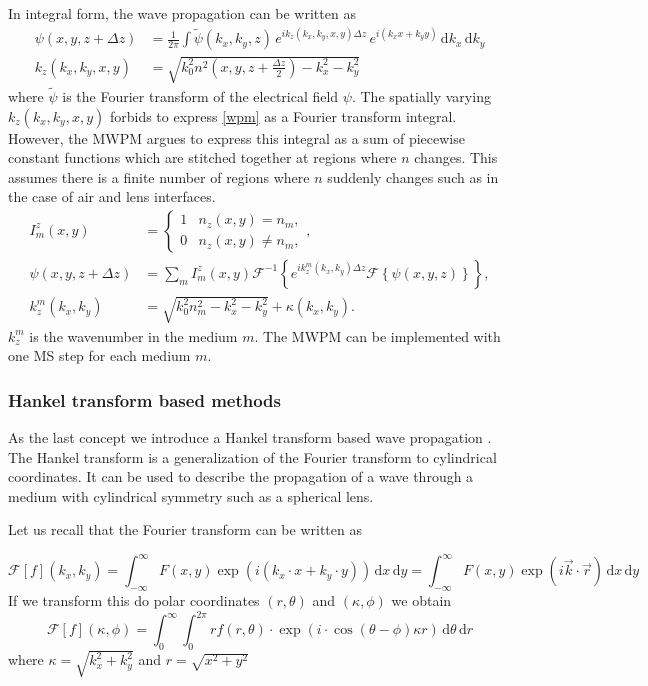 \documentclass[a4paper,12pt]{article}
\begin{document}
In integral form, the wave propagation can be written as
\begin{align}
\label{wpm}
    \psi(x,y,z+\Delta z) &= \frac{1}{2\pi} \int \widetilde{\psi}(k_x, k_y, z) \, e^{ik_z(k_x, k_y, x, y) \Delta z} \, e^{i (k_x x + k_y y)} \, \mathrm{d}k_x \, \mathrm{d}k_y\\
    k_z(k_x, k_y, x, y) &= \sqrt{k_0^2 n^2 \left( x,y,z + \frac{\Delta z}{2} \right) - k_x^2 - k_y^2}
\end{align}
where $\widetilde{\psi}$ is the Fourier transform of the electrical field $\psi$.
The spatially varying $k_z(k_x, k_y, x, y)$ forbids to express \autoref{wpm} as a Fourier transform integral.
However, the MWPM argues to express this integral as a sum of piecewise constant functions which are stitched together at regions where $n$ changes.
This assumes there is a finite number of regions where $n$ suddenly changes such as in the case of air and lens interfaces.
\begin{align}
    I_m^z(x,y) &=
    \begin{cases}
    1 & n_z(x,y) = n_m, \\
    0 & n_z(x,y) \ne n_m,
    \end{cases}, \\
    \psi(x,y,z+\Delta z) &= \sum_m I_m^z(x,y) \mathcal{F}^{-1} \left\{ e^{i k_z^m(k_x,k_y)\Delta z} \mathcal{F} \left\{\psi(x,y,z) \right\} \right\},\\
    k_z^m(k_x, k_y) &= \sqrt{k_0^2 n_m^2 - k_x^2 - k_y^2} + \kappa(k_x, k_y).
\end{align}
$k_z^m$ is the wavenumber in the medium $m$.
The MWPM can be implemented with one MS step for each medium $m$.


\subsubsection{Hankel transform based methods}
As the last concept we introduce a Hankel transform based wave propagation \cite{Guizar-Sicairos_Gutiérrez-Vega_2004}.
The Hankel transform is a generalization of the Fourier transform to cylindrical coordinates. It can be used to describe the propagation of a wave through a medium with cylindrical symmetry such as a spherical lens.

Let us recall that the Fourier transform can be written as

\begin{equation}
\mathcal{F}[f](k_x, k_y) = \int_{-\infty}^{\infty} F(x,y) \exp(i (k_x \cdot x + k_y \cdot y)) \,\mathrm{d}x\, \mathrm{d}y = \int_{-\infty}^{\infty} F(x,y) \exp(i \vec k \cdot \vec r) \,\mathrm{d}x\, \mathrm{d}y
\end{equation}
If we transform this do polar coordinates $(r, \theta)$ and $(\kappa, \phi)$ we obtain
\begin{equation}
\mathcal{F}[f](\kappa, \phi) = \int_{0}^{\infty} \int_{0}^{2\pi} r f(r, \theta)\cdot \exp(i \cdot \cos(\theta - \phi) \kappa r)  \,\mathrm{d}\theta\, \mathrm{d}r
\end{equation}
where $\kappa = \sqrt{k_x^2 + k_y^2}$ and $r=\sqrt{x^2 + y^2}$
\end{document}
